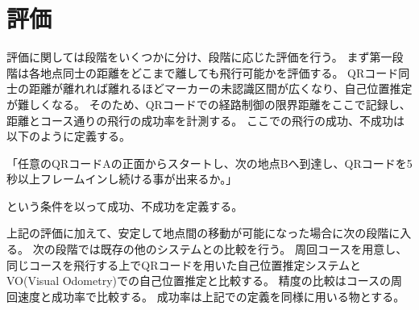 \section {評価}
評価に関しては段階をいくつかに分け、段階に応じた評価を行う。
まず第一段階は各地点同士の距離をどこまで離しても飛行可能かを評価する。
QRコード同士の距離が離れれば離れるほどマーカーの未認識区間が広くなり、自己位置推定が難しくなる。
そのため、QRコードでの経路制御の限界距離をここで記録し、距離とコース通りの飛行の成功率を計測する。
ここでの飛行の成功、不成功は以下のように定義する。

「任意のQRコードAの正面からスタートし、次の地点Bへ到達し、QRコードを5秒以上フレームインし続ける事が出来るか。」

という条件を以って成功、不成功を定義する。

上記の評価に加えて、安定して地点間の移動が可能になった場合に次の段階に入る。
次の段階では既存の他のシステムとの比較を行う。
周回コースを用意し、同じコースを飛行する上でQRコードを用いた自己位置推定システムとVO(Visual Odometry)での自己位置推定と比較する。
精度の比較はコースの周回速度と成功率で比較する。
成功率は上記での定義を同様に用いる物とする。
